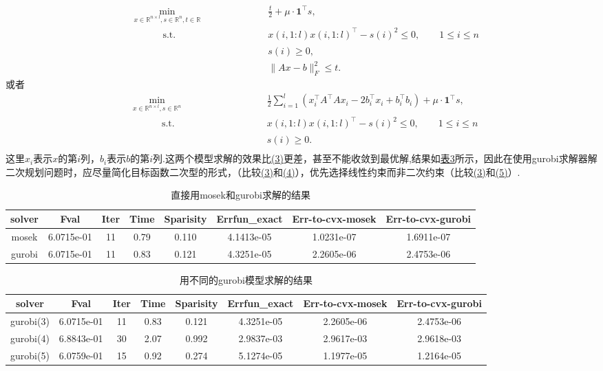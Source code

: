 \documentclass[10pt,a4paper]{article}
\begin{document}
\begin{equation}
	\begin{alignedat}{2}
		&\min_{x\in \mathbb{R}^{n\times l}, s\in\mathbb{R}^{n},t\in \mathbb{R}} &\quad& \frac{t}{2}+\mu\cdot\mathbf{1}^{\top}s,\\
		&\qquad\quad\text{s.t.}\phantom{{}_{x\in \mathbb{R}^{n\times l}, t\in \mathbb{R}, s\in\mathbb{R}^{n}}} & & x(i,1:l)x(i,1:l)^{\top}-s(i)^{2}\leq 0,\qquad 1\leq i\leq n\\
		\
		&&&s(i)\geq 0,\\
		&&&\|Ax-b\|_{F}^{2}\leq t.
	\end{alignedat}
	\label{6}
\end{equation}
或者
\begin{equation}
	\begin{alignedat}{2}
		&\min_{x\in \mathbb{R}^{n\times l}, s\in\mathbb{R}^{n}} &\quad& \frac{1}{2}\sum\limits_{i=1}^{l}(x_{i}^{\top}A^{\top}Ax_{i}-2b_{i}^{\top}x_{i}+b_{i}^{\top}b_{i})+\mu\cdot\mathbf{1}^{\top}s,\\
		&\qquad\quad\text{s.t.}\phantom{{}_{x\in \mathbb{R}^{n\times l}, t\in \mathbb{R}, s\in\mathbb{R}^{n}}} & & x(i,1:l)x(i,1:l)^{\top}-s(i)^{2}\leq 0,\qquad 1\leq i\leq n\\
		&&&s(i)\geq 0.\\
	\end{alignedat}
	\label{7}
\end{equation}
这里$x_{i}$表示$x$的第$i$列，$b_{i}$表示$b$的第$i$列.这两个模型求解的效果比\hyperref[4]{(3)}更差，甚至不能收敛到最优解,结果如\hyperref[8]{表3}所示，因此在使用gurobi求解器解二次规划问题时，应尽量简化目标函数二次型的形式，（比较\hyperref[4]{(3)}和\hyperref[6]{(4)}），优先选择线性约束而非二次约束（比较\hyperref[4]{(3)}和\hyperref[7]{(5)}）.
\begin{table}[h]
	\centering
	\begin{tabular}{|c|c|c|c|c|c|c|c|}
		\hline
		solver& Fval&Iter  &Time&Sparisity& Errfun\_exact &Err-to-cvx-mosek&Err-to-cvx-gurobi\\
		\hline
		mosek&6.0715e-01&11&0.79&0.110&4.1413e-05&1.0231e-07&1.6911e-07\\
		\hline
		gurobi&6.0715e-01&11&0.83&0.121&4.3251e-05&2.2605e-06&2.4753e-06\\
		\hline
	\end{tabular}
	\caption{直接用mosek和gurobi求解的结果}
	\label{5}
\end{table}
\begin{table}[h]
	\centering
	\begin{tabular}{|c|c|c|c|c|c|c|c|}
		\hline
		solver& Fval&Iter  &Time&Sparisity& Errfun\_exact &Err-to-cvx-mosek&Err-to-cvx-gurobi\\
		\hline
		gurobi(3)&6.0715e-01&11&0.83&0.121&4.3251e-05&2.2605e-06&2.4753e-06\\
		\hline
		gurobi(4)&6.8843e-01&30&2.07&0.992&2.9837e-03&2.9617e-03&2.9618e-03\\
		\hline
		gurobi(5)&6.0759e-01&15&0.92&0.274&5.1274e-05&1.1977e-05&1.2164e-05\\
		\hline
	
	\end{tabular}
	\caption{用不同的gurobi模型求解的结果}
	\label{8}
\end{table}
\end{document}
